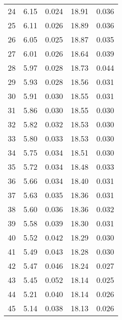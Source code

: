 \begin{table}
\begin{tabular}{c|ll|ll}
24 & 6.15 & 0.024 & 18.91 & 0.036 \\
25 & 6.11 & 0.026 & 18.89 & 0.036 \\
26 & 6.05 & 0.025 & 18.87 & 0.035 \\
27 & 6.01 & 0.026 & 18.64 & 0.039 \\
28 & 5.97 & 0.028 & 18.73 & 0.044 \\
29 & 5.93 & 0.028 & 18.56 & 0.031 \\
30 & 5.91 & 0.030 & 18.55 & 0.031 \\
31 & 5.86 & 0.030 & 18.55 & 0.030 \\
32 & 5.82 & 0.032 & 18.53 & 0.030 \\
33 & 5.80 & 0.033 & 18.53 & 0.030 \\
34 & 5.75 & 0.034 & 18.51 & 0.030 \\
35 & 5.72 & 0.034 & 18.48 & 0.033 \\
36 & 5.66 & 0.034 & 18.40 & 0.031 \\
37 & 5.63 & 0.035 & 18.36 & 0.031 \\
38 & 5.60 & 0.036 & 18.36 & 0.032 \\
39 & 5.58 & 0.039 & 18.30 & 0.031 \\
40 & 5.52 & 0.042 & 18.29 & 0.030 \\
41 & 5.49 & 0.043 & 18.28 & 0.030 \\
42 & 5.47 & 0.046 & 18.24 & 0.027 \\
43 & 5.45 & 0.052 & 18.14 & 0.025 \\
44 & 5.21 & 0.040 & 18.14 & 0.026 \\
45 & 5.14 & 0.038 & 18.13 & 0.026 \\
               \hline
        \end{tabular}
    \end{table}
    \clearpage

